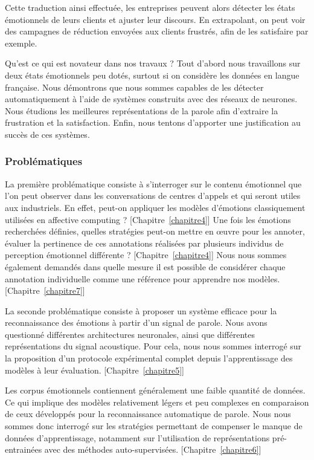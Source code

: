 Cette traduction ainsi effectuée, les entreprises peuvent alors détecter les états émotionnels de leurs clients et ajuster leur discours. En extrapolant, on peut voir des campagnes de réduction envoyées aux clients frustrés, afin de les satisfaire par exemple.

Qu'est ce qui est novateur dans nos travaux ? Tout d'abord nous travaillons sur deux états émotionnels peu dotés, surtout si on considère les données en langue française. Nous démontrons que nous sommes capables de les détecter automatiquement à l'aide de systèmes construits avec des réseaux de neurones. Nous étudions les meilleures représentations de la parole afin d'extraire la frustration et la satisfaction. Enfin, nous tentons d'apporter une justification au succès de ces systèmes.

\subsubsection{Problématiques}
La première problématique consiste à s’interroger sur le contenu émotionnel que l’on peut observer dans les conversations de centres d’appels et qui seront utiles aux industriels. En effet, peut-on appliquer les modèles d’émotions classiquement utilisées en affective computing ? [Chapitre~\ref{chapitre4}] Une fois les émotions recherchées définies, quelles stratégies peut-on mettre en œuvre pour les annoter, évaluer la pertinence de ces annotations réalisées par plusieurs individus de perception émotionnel différente ? [Chapitre~\ref{chapitre4}] Nous nous sommes également demandés dans quelle mesure il est possible de considérer chaque annotation individuelle comme une référence pour apprendre nos modèles. [Chapitre~\ref{chapitre7}]

La seconde problématique consiste à proposer un système efficace pour la reconnaissance des émotions à partir d’un signal de parole. Nous avons questionné différentes architectures neuronales, ainsi que différentes représentations du signal acoustique. Pour cela, nous nous sommes interrogé sur la proposition d’un protocole expérimental complet depuis l’apprentissage des modèles à leur évaluation. [Chapitre~\ref{chapitre5}]

Les corpus émotionnels contiennent généralement une faible quantité de données. Ce qui implique des modèles relativement légers et peu complexes en comparaison de ceux développés pour la reconnaissance automatique de parole. Nous nous sommes donc interrogé sur les stratégies permettant de compenser le manque de données d’apprentissage, notamment sur l’utilisation de représentations pré-entrainées avec des méthodes auto-supervisées. [Chapitre~\ref{chapitre6}]


